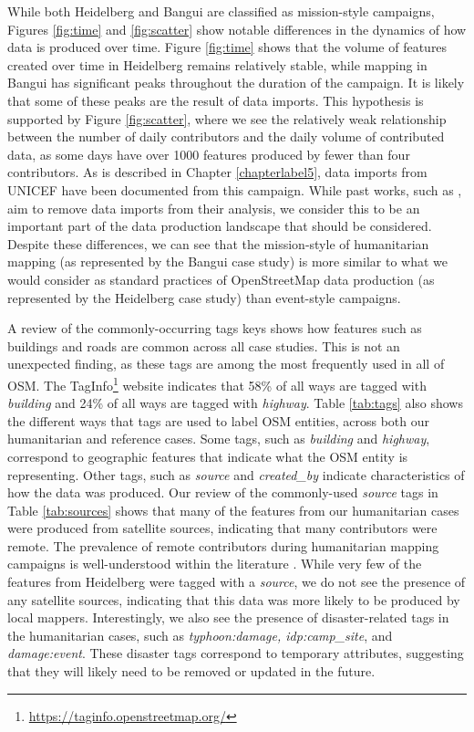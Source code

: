 While both Heidelberg and Bangui are classified as mission-style campaigns, Figures \ref{fig:time} and \ref{fig:scatter} show notable differences in the dynamics of how data is produced over time. Figure \ref{fig:time} shows that the volume of features created over time in Heidelberg remains relatively stable, while mapping in Bangui has significant peaks throughout the duration of the campaign. It is likely that some of these peaks are the result of data imports. This hypothesis is supported by Figure \ref{fig:scatter}, where we see the relatively weak relationship between the number of daily contributors and the daily volume of contributed data, as some days have over 1000 features produced by fewer than four contributors. As is described in Chapter \ref{chapterlabel5}, data imports from UNICEF have been documented from this campaign. While past works, such as \textcite{ahmouda_analyzing_2018}, aim to remove data imports from their analysis, we consider this to be an important part of the data production landscape that should be considered. Despite these differences, we can see that the mission-style of humanitarian mapping (as represented by the Bangui case study) is more similar to what we would consider as standard practices of OpenStreetMap data production (as represented by the Heidelberg case study) than event-style campaigns.

A review of the commonly-occurring tags keys shows how features such as buildings and roads are common across all case studies. This is not an unexpected finding, as these tags are among the most frequently used in all of OSM. The TagInfo\footnote{\url{https://taginfo.openstreetmap.org/}} website indicates that 58\% of all ways are tagged with \textit{building} and 24\% of all ways are tagged with \textit{highway}. Table \ref{tab:tags} also shows the different ways that tags are used to label OSM entities, across both our humanitarian and reference cases. Some tags, such as \textit{building} and \textit{highway}, correspond to geographic features that indicate what the OSM entity is representing. Other tags, such as \textit{source} and \textit{created_by} indicate characteristics of how the data was produced. Our review of the commonly-used \textit{source} tags in Table \ref{tab:sources} shows that many of the features from our humanitarian cases were produced from satellite sources, indicating that many contributors were remote. The prevalence of remote contributors during humanitarian mapping campaigns is well-understood within the literature \parencite{dittus_mass_2017, eckle_quality_2015}. While very few of the features from Heidelberg were tagged with a \textit{source}, we do not see the presence of any satellite sources, indicating that this data was more likely to be produced by local mappers. Interestingly, we also see the presence of disaster-related tags in the humanitarian cases, such as \textit{typhoon:damage, idp:camp_site}, and \textit{damage:event}. These disaster tags correspond to temporary attributes, suggesting that they will likely need to be removed or updated in the future. \\

